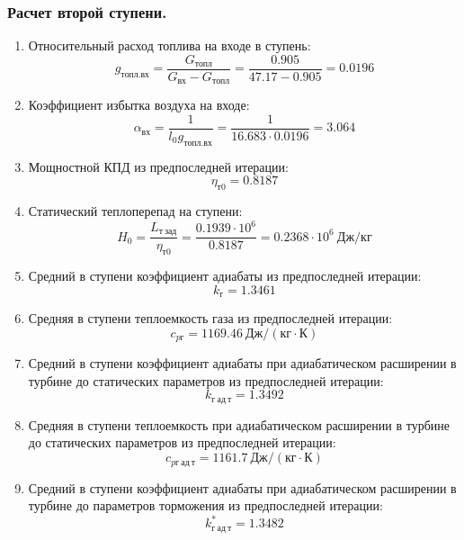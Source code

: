 \documentclass[a4paper,12pt]{article}
\begin{document}
    \subsubsection{Расчет второй ступени.}
%    

    \begin{enumerate}

        \item Относительный расход топлива на входе в ступень:
        \[
            g_{топл.вх} = \frac{ G_{топл} }{ G_{вх} - G_{топл} } =
                \frac{ 0.905 }{ 47.17 - 0.905 } =
            0.0196
        \]

        \item Коэффициент избытка воздуха на входе:
        \[
            \alpha_{вх} = \frac{ 1 }{ l_0 g_{топл.вх} } =
                \frac{ 1 }{ 16.683 \cdot 0.0196 } =
            3.064
        \]

        \item Мощностной КПД из предпоследней итерации:
        \[
            \eta_{т0} = 0.8187
        \]

        \item Статический теплоперепад на ступени:
        \[
            H_0 = \frac{L_{т\ зад}}{\eta_{т0}} =
                \frac{ 0.1939 \cdot 10^6 }{ 0.8187 } =
            0.2368 \cdot 10^6 \ Дж/кг
        \]

        \item Средний в ступени коэффициент адиабаты из предпоследней итерации:
        \[
            k_г = 1.3461
        \]

        \item Средняя в ступени теплоемкость газа из предпоследней итерации:
        \[
            c_{pг} = 1169.46 \ Дж/(кг \cdot К)
        \]

        \item Средний в ступени коэффициент адиабаты при адиабатическом расширении в турбине до статических параметров из предпоследней итерации:
        \[
            k_{г\ ад\ т} = 1.3492
        \]

        \item Средняя в ступени теплоемкость при адиабатическом расширении в турбине до статических параметров из предпоследней итерации:
        \[
            c_{pг\ ад\ т} = 1161.7 \ Дж/(кг \cdot К)
        \]

        \item Средний в ступени коэффициент адиабаты при адиабатическом расширении в турбине до параметров торможения из предпоследней итерации:
        \[
            k_{г\ ад\ т}^* = 1.3482
        \]


\end{enumerate}
\end{document}
